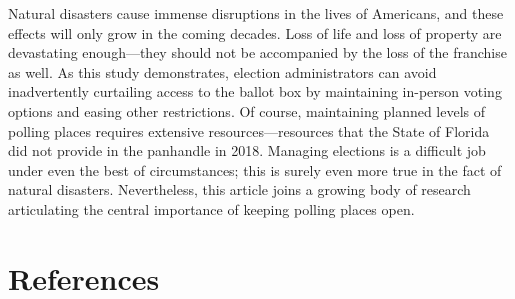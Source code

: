 \documentclass[
  12pt,
]{article}
\begin{document}
Natural disasters cause immense disruptions in the lives of Americans, and these effects will only grow in the coming decades. Loss of life and loss of property are devastating enough---they should not be accompanied by the loss of the franchise as well. As this study demonstrates, election administrators can avoid inadvertently curtailing access to the ballot box by maintaining in-person voting options and easing other restrictions. Of course, maintaining planned levels of polling places requires extensive resources---resources that the State of Florida did not provide in the panhandle in 2018. Managing elections is a difficult job under even the best of circumstances; this is surely even more true in the fact of natural disasters. Nevertheless, this article joins a growing body of research articulating the central importance of keeping polling places open.

\newpage

\hypertarget{references}{%
\section*{References}\label{references}}
\end{document}
